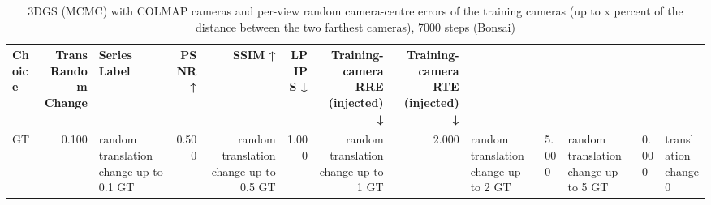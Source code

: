 \begin{table}[H]
\caption{\ifdefined\customcaption \customcaption \else 3DGS (MCMC) with COLMAP cameras and per-view random camera-centre errors of the training cameras (up to x percent of the distance between the two farthest cameras), 7000 steps (Bonsai) \fi}
\label{tab:126_colmap_translation_error_bonsai}
\centering
\scriptsize
\begin{tabular}{lrlrrrrr}
\toprule
Choice & Trans Random Change & Series Label & PSNR ↑ & SSIM ↑ & LPIPS ↓ & Training-camera RRE (injected) ↓ & Training-camera RTE (injected) ↓ \\
\midrule
GT & 0.100 & random translation change up to 0.1%
GT & 0.500 & random translation change up to 0.5%
GT & 1.000 & random translation change up to 1%
GT & 2.000 & random translation change up to 2%
GT & 5.000 & random translation change up to 5%
GT & 0.000 & translation change 0%
\bottomrule
\end{tabular}
\end{table}